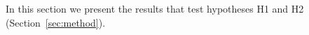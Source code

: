 In this section we present the results that test hypotheses H1 and H2 (Section~\ref{sec:method}).









